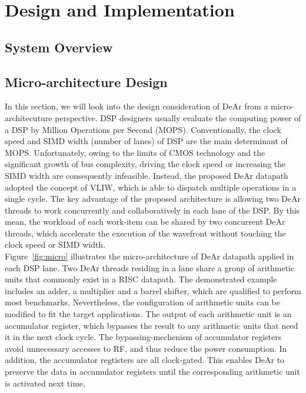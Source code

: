 \chapter{Design and Implementation}
    \section{System Overview}
    \section{Micro-architecture Design}
        In this section, we will look into the design consideration of DeAr from a micro-architecuture perspective.
        DSP designers usually evaluate the computing power of a DSP by Million Operations per Second (MOPS).
        Conventionally, the clock speed and SIMD width (number of lanes) of DSP are the main determinant of MOPS.
        Unfortunately, owing to the limits of CMOS technology and the significant growth of bus complexity, 
        driving the clock speed or increasing the SIMD width are consequently infeasible.
        Instead, the proposed DeAr datapath adopted the concept of VLIW, 
        which is able to dispatch multiple operations in a single cycle.
        The key advantage of the proposed architecture is allowing two DeAr threads to work concurrently and collaboratively in each lane of the DSP.
        By this mean, the workload of each work-item can be shared by two concurrent DeAr threads, 
        which accelerate the execution of the wavefront without touching the clock speed or SIMD width.
        \\\indent
        Figure~\ref{fig:micro} illustrates the micro-architecture of DeAr datapath applied in each DSP lane.
        Two DeAr threads residing in a lane share a group of arithmetic units that commonly exist in a RISC datapath.
        The demonstrated example includes an adder, a multiplier and a barrel shifter, which are qualified to perform most benchmarks,
        Nevertheless, the configuration of arithmetic units can be modified to fit the target applications.
        The output of each arithmetic unit is an accumulator register, 
        which bypasses the result to any arithmetic units that need it in the next clock cycle.
        The bypassing-mechenism of accumulator registers avoid unnecessary accesses to RF, 
        and thus reduce the power consumption.
        In addition, the accumulator regtisters are all clock-gated.
        This enables DeAr to preserve the data in accumulator registers until the corresponding arithmetic unit is activated next time, 
